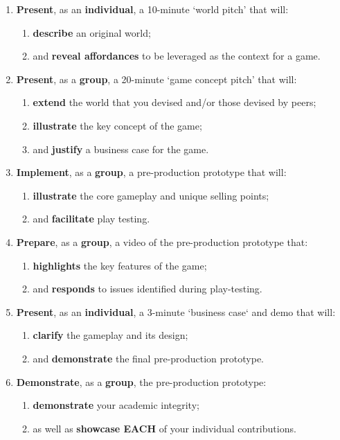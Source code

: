 \documentclass{../../fal_assignment}
\begin{document}
\begin{enumerate}[label=(\Alph*)]
    \item \textbf{Present}, as an \textbf{individual}, a 10-minute `world pitch' that will:
    	\begin{enumerate}[label=\roman*.]
    		\item \textbf{describe} an original world;
    		\item and \textbf{reveal affordances} to be leveraged as the context for a game.
	\end{enumerate}
    \item \textbf{Present}, as a \textbf{group}, a 20-minute `game concept pitch' that will:
    	\begin{enumerate}[label=\roman*.]
    		\item \textbf{extend} the world that you devised and/or those devised by peers;
    		\item \textbf{illustrate} the key concept of the game;
    		\item and \textbf{justify} a business case for the game.
	\end{enumerate}
    \item \textbf{Implement}, as a \textbf{group}, a pre-production prototype that will:
    	\begin{enumerate}[label=\roman*.]
    		\item \textbf{illustrate} the core gameplay and unique selling points;
    		\item and \textbf{facilitate} play testing.
	\end{enumerate}
    \item \textbf{Prepare}, as a \textbf{group}, a video of the pre-production prototype that:
    	\begin{enumerate}[label=\roman*.]
    		\item \textbf{highlights} the key features of the game;
    		\item and \textbf{responds} to issues identified during play-testing.
	\end{enumerate}
    \item \textbf{Present}, as an \textbf{individual}, a 3-minute `business case` and demo that will:
    	\begin{enumerate}[label=\roman*.]
    		\item \textbf{clarify} the gameplay and its design;
    		\item and \textbf{demonstrate} the final pre-production prototype.
	\end{enumerate}
    \item \textbf{Demonstrate}, as a \textbf{group}, the pre-production prototype:
    	\begin{enumerate}[label=\roman*.]
    		\item \textbf{demonstrate} your academic integrity;
    		\item as well as \textbf{showcase EACH} of your individual contributions.
	\end{enumerate}
\end{enumerate}
\end{document}
